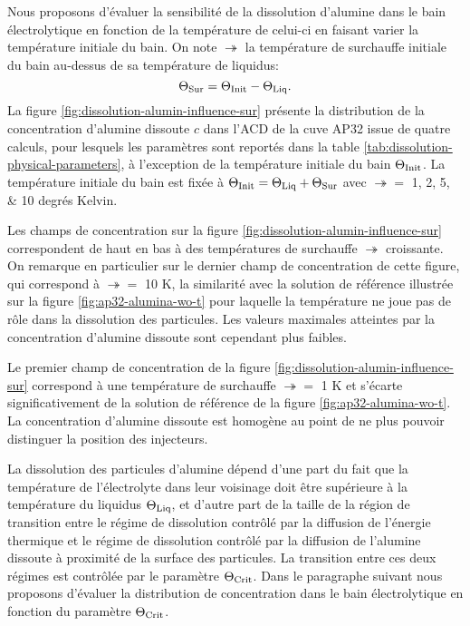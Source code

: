 

Nous proposons d'évaluer la sensibilité de la dissolution d'alumine
dans le bain électrolytique en fonction de la température de celui-ci
en faisant varier la température initiale du bain. On note $\tsur$ la
température de surchauffe initiale du bain au-dessus de sa température de
liquidus:
\begin{equation}
  \Theta_\text{Sur} = \Theta_\text{Init} - \Theta_\text{Liq}.
\end{equation}
La figure \ref{fig:dissolution-alumin-influence-sur} présente la distribution
de la concentration d'alumine dissoute $c$ dans l'ACD de la cuve AP32
issue de quatre calculs, pour lesquels les paramètres sont reportés
dans la table \ref{tab:dissolution-physical-parameters}, à
l'exception de la température initiale du bain $\Theta_\text{Init}$. La
température initiale du bain est fixée à $\Theta_\text{Init} = \Theta_\text{Liq} + \Theta_\text{Sur}$ avec $\tsur = $ \numlist{1;2;5;10} degrés Kelvin.

Les champs de concentration sur la figure
\ref{fig:dissolution-alumin-influence-sur} correspondent de haut en
bas à des températures de surchauffe $\tsur$ croissante. On remarque
en particulier sur le dernier champ de concentration de cette figure,
qui correspond à $\tsur = $ \num{10} \si{\kelvin}, la similarité avec la
solution de référence illustrée sur la figure
\ref{fig:ap32-alumina-wo-t} pour laquelle la température ne joue pas
de rôle dans la dissolution des particules. Les valeurs maximales
atteintes par la concentration d'alumine dissoute sont cependant plus faibles.

Le premier champ de concentration de la figure
\ref{fig:dissolution-alumin-influence-sur} correspond à une
température de surchauffe $\tsur =$ \num{1} \si{\kelvin} et s'écarte
significativement de la solution de référence de la figure
\ref{fig:ap32-alumina-wo-t}. La concentration d'alumine dissoute est
homogène au point de ne plus pouvoir distinguer la position des
injecteurs.

La dissolution des particules d'alumine dépend d'une part du fait que
la température de l'électrolyte dans leur voisinage doit être
supérieure à la température du liquidus $\Theta_\text{Liq}$, et d'autre part de la
taille de la région de transition entre le régime de dissolution
contrôlé par la diffusion de l'énergie thermique et le régime de
dissolution contrôlé par la diffusion de l'alumine dissoute à
proximité de la surface des particules. La transition entre ces deux
régimes est contrôlée par le paramètre $\Theta_\text{Crit}$. Dans le paragraphe
suivant nous proposons d'évaluer la distribution de concentration dans
le bain électrolytique en fonction du paramètre $\Theta_\text{Crit}$.


